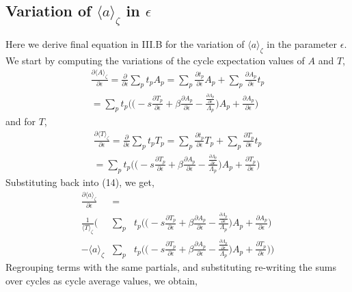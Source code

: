 \documentclass[twocolumn,aip,cha]{revtex4-1}
\begin{document}
\subsection{Variation of $\langle a \rangle_{\zeta}$ in $\epsilon$}
Here we derive final equation in III.B for the variation of $\langle a\rangle_{\zeta}$ in the parameter $\epsilon$. We start by computing the variations of the cycle expectation values of $A$ and $T$,
\begin{eqnarray*}
\frac{\partial \langle A \rangle_{\zeta}}{\partial \epsilon} = \frac{\partial}{\partial \epsilon}\sum_{p}t_{p}A_{p} = \sum_{p}\frac{\partial t_{p}}{\partial \epsilon}A_{p} + \sum_{p} \frac{\partial A_{p}}{\partial \epsilon} t_{p}
\\ = \sum_{p}t_{p}\Bigg( \Bigg( -s\frac{\partial T_{p}}{\partial \epsilon} + \beta \frac{\partial A_{p}}{\partial \epsilon} - \frac{\frac{\partial \Lambda_{p}}{\partial \epsilon}}{\Lambda_{p}}\Bigg) A_{p} +\frac{\partial A_{p}}{\partial \epsilon} \Bigg)
\end{eqnarray*}
and for $T$,
\begin{eqnarray*}
\frac{\partial \langle T \rangle_{\zeta}}{\partial \epsilon} = \frac{\partial}{\partial \epsilon}\sum_{p}t_{p}T_{p} = \sum_{p}\frac{\partial t_{p}}{\partial \epsilon}T_{p} + \sum_{p} \frac{\partial T_{p}}{\partial \epsilon} t_{p}
\\ = \sum_{p}t_{p}\Bigg( \Bigg( -s\frac{\partial T_{p}}{\partial \epsilon} + \beta \frac{\partial A_{p}}{\partial \epsilon} - \frac{\frac{\partial \Lambda_{p}}{\partial \epsilon}}{\Lambda_{p}}\Bigg) A_{p} +\frac{\partial T_{p}}{\partial \epsilon} \Bigg)
\end{eqnarray*}
Substituting back into (14), we get,
\begin{eqnarray*}
\frac{\partial \langle a \rangle_{\zeta}}{\partial \epsilon} &=&
\\ \frac{1}{\langle T\rangle_{\zeta}}\Bigg( &\sum_{p}&t_{p}\Bigg( \Bigg( -s\frac{\partial T_{p}}{\partial \epsilon} + \beta \frac{\partial A_{p}}{\partial \epsilon} - \frac{\frac{\partial \Lambda_{p}}{\partial \epsilon}}{\Lambda_{p}}\Bigg) A_{p} +\frac{\partial A_{p}}{\partial \epsilon} \Bigg)
\\ - \langle a \rangle_{\zeta} &\sum_{p}&t_{p}\Bigg( \Bigg( -s\frac{\partial T_{p}}{\partial \epsilon} + \beta \frac{\partial A_{p}}{\partial \epsilon} - \frac{\frac{\partial \Lambda_{p}}{\partial \epsilon}}{\Lambda_{p}}\Bigg) A_{p} +\frac{\partial T_{p}}{\partial \epsilon} \Bigg) \Bigg)
\end{eqnarray*}
Regrouping terms with the same partials, and substituting re-writing the sums  over cycles as cycle average values, we obtain,
\end{document}
